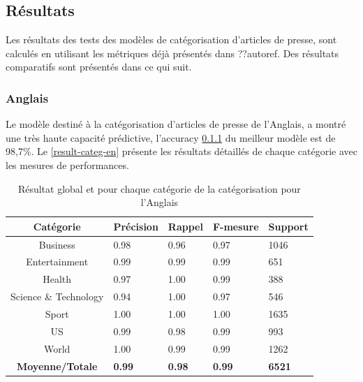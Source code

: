 \subsection{Résultats}
    Les résultats des tests des modèles de catégorisation d'articles de presse, sont calculés en utilisant les métriques déjà présentés dans ??autoref{}. Des résultats comparatifs sont présentés dans ce qui suit.
    \subsubsection{Anglais}
    Le modèle destiné à la catégorisation d'articles de presse de l'Anglais, a montré une très haute capacité prédictive, l'accuracy \ref{} du meilleur modèle est de 98,7\%. Le \autoref{result-categ-en} présente les résultats détaillés de chaque catégorie avec les mesures de performances.
    \begin{table}[H]
        \begin{center}
            \begin{tabular}{|c|C{2cm}|C{2cm}|C{2cm}|C{2cm}|}
                \hline
                \textbf{Catégorie} &  \textbf{Précision} &  \textbf{Rappel} &  \textbf{F-mesure} &  \textbf{Support} \\
                \hline
                Business & 0.98 & 0.96 & 0.97 & 1046 \\
                Entertainment & 0.99 & 0.99 & 0.99 & 651 \\
                Health & 0.97 & 1.00 & 0.99 & 388 \\
                Science \& Technology & 0.94 & 1.00 & 0.97 & 546 \\
                Sport & 1.00 & 1.00 & 1.00 & 1635 \\
                US & 0.99 & 0.98 & 0.99 & 993 \\
                World & 1.00 & 0.99 & 0.99 & 1262 \\                          
                \textbf{Moyenne/Totale} & \textbf{0.99} & \textbf{0.98} & \textbf{0.99} & \textbf{6521} \\
                \hline
            \end{tabular}
        \end{center}
        \caption{Résultat global et pour chaque catégorie de la catégorisation pour l'Anglais}
        \label{result-categ-en}
    \end{table}

